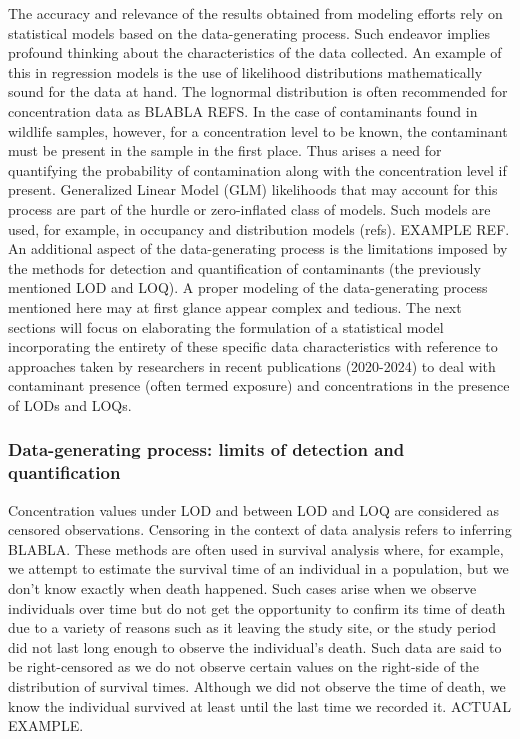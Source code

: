 \documentclass[
]{article}
\begin{document}
The accuracy and relevance of the results obtained from modeling efforts
rely on statistical models based on the data-generating process. Such
endeavor implies profound thinking about the characteristics of the data
collected. An example of this in regression models is the use of
likelihood distributions mathematically sound for the data at hand. The
lognormal distribution is often recommended for concentration data as
BLABLA REFS. In the case of contaminants found in wildlife samples,
however, for a concentration level to be known, the contaminant must be
present in the sample in the first place. Thus arises a need for
quantifying the probability of contamination along with the
concentration level if present. Generalized Linear Model (GLM)
likelihoods that may account for this process are part of the hurdle or
zero-inflated class of models. Such models are used, for example, in
occupancy and distribution models (refs). EXAMPLE REF. An additional
aspect of the data-generating process is the limitations imposed by the
methods for detection and quantification of contaminants (the previously
mentioned LOD and LOQ). A proper modeling of the data-generating process
mentioned here may at first glance appear complex and tedious. The next
sections will focus on elaborating the formulation of a statistical
model incorporating the entirety of these specific data characteristics
with reference to approaches taken by researchers in recent publications
(2020-2024) to deal with contaminant presence (often termed exposure)
and concentrations in the presence of LODs and LOQs.

\subsubsection{Data-generating process: limits of detection and
quantification}\label{data-generating-process-limits-of-detection-and-quantification}

Concentration values under LOD and between LOD and LOQ are considered as
censored observations. Censoring in the context of data analysis refers
to inferring BLABLA. These methods are often used in survival analysis
where, for example, we attempt to estimate the survival time of an
individual in a population, but we don't know exactly when death
happened. Such cases arise when we observe individuals over time but do
not get the opportunity to confirm its time of death due to a variety of
reasons such as it leaving the study site, or the study period did not
last long enough to observe the individual's death. Such data are said
to be right-censored as we do not observe certain values on the
right-side of the distribution of survival times. Although we did not
observe the time of death, we know the individual survived at least
until the last time we recorded it. ACTUAL EXAMPLE.
\end{document}
